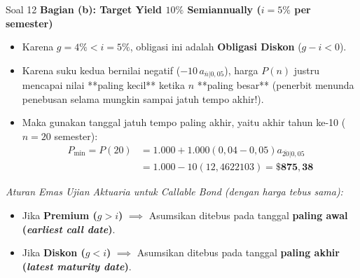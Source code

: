 \documentclass[11pt,a4paper]{article}
\begin{document}
\begin{solutionbox}{Soal 12}
\textbf{Bagian (b): Target Yield $10\%$ Semiannually ($i = 5\%$ per semester)}
\begin{itemize}
    \item Karena $g = 4\% < i = 5\%$, obligasi ini adalah \textbf{Obligasi Diskon} ($g - i < 0$).
    \item Karena suku kedua bernilai negatif ($-10 \, a_{\overline{n}|0{,}05}$), harga $P(n)$ justru mencapai nilai **paling kecil** ketika $n$ **paling besar** (penerbit menunda penebusan selama mungkin sampai jatuh tempo akhir!).
    \item Maka gunakan tanggal jatuh tempo paling akhir, yaitu akhir tahun ke-10 ($n = 20$ semester):
    \begin{align*}
        P_{\min} = P(20) &= 1.000 + 1.000(0{,}04 - 0{,}05) a_{\overline{20}|0{,}05} \\
                         &= 1.000 - 10(12{,}4622103) = \mathbf{\$875{,}38}
    \end{align*}
\end{itemize}
\textit{Aturan Emas Ujian Aktuaria untuk Callable Bond (dengan harga tebus sama):}
\begin{itemize}[topsep=2pt, itemsep=1pt]
    \item Jika \textbf{Premium ($g > i$)} $\implies$ Asumsikan ditebus pada tanggal \textbf{paling awal (\textit{earliest call date})}.
    \item Jika \textbf{Diskon ($g < i$)} $\implies$ Asumsikan ditebus pada tanggal \textbf{paling akhir (\textit{latest maturity date})}.
\end{itemize}
\end{solutionbox}
\end{document}
